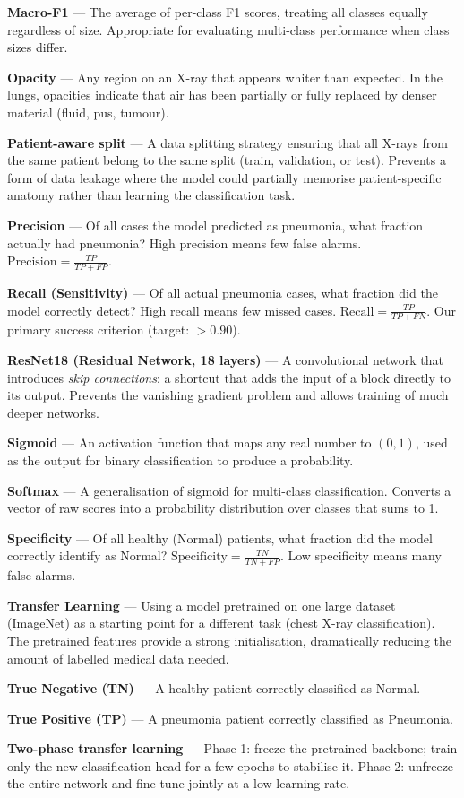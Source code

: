 \documentclass[12pt,a4paper]{article}
\begin{document}
\begin{tcolorbox}[glossbox={Key Terms Explained}]
\medskip
\textbf{Macro-F1} --- The average of per-class F1 scores, treating all classes equally regardless of size. Appropriate for evaluating multi-class performance when class sizes differ.

\medskip
\textbf{Opacity} --- Any region on an X-ray that appears whiter than expected. In the lungs, opacities indicate that air has been partially or fully replaced by denser material (fluid, pus, tumour).

\medskip
\textbf{Patient-aware split} --- A data splitting strategy ensuring that all X-rays from the same patient belong to the same split (train, validation, or test). Prevents a form of data leakage where the model could partially memorise patient-specific anatomy rather than learning the classification task.

\medskip
\textbf{Precision} --- Of all cases the model predicted as pneumonia, what fraction actually had pneumonia? High precision means few false alarms. $\text{Precision} = \frac{TP}{TP + FP}$.

\medskip
\textbf{Recall (Sensitivity)} --- Of all actual pneumonia cases, what fraction did the model correctly detect? High recall means few missed cases. $\text{Recall} = \frac{TP}{TP + FN}$. Our primary success criterion (target: $> 0.90$).

\medskip
\textbf{ResNet18 (Residual Network, 18 layers)} --- A convolutional network that introduces \emph{skip connections}: a shortcut that adds the input of a block directly to its output. Prevents the vanishing gradient problem and allows training of much deeper networks.

\medskip
\textbf{Sigmoid} --- An activation function that maps any real number to $(0, 1)$, used as the output for binary classification to produce a probability.

\medskip
\textbf{Softmax} --- A generalisation of sigmoid for multi-class classification. Converts a vector of raw scores into a probability distribution over classes that sums to 1.

\medskip
\textbf{Specificity} --- Of all healthy (Normal) patients, what fraction did the model correctly identify as Normal? $\text{Specificity} = \frac{TN}{TN + FP}$. Low specificity means many false alarms.

\medskip
\textbf{Transfer Learning} --- Using a model pretrained on one large dataset (ImageNet) as a starting point for a different task (chest X-ray classification). The pretrained features provide a strong initialisation, dramatically reducing the amount of labelled medical data needed.

\medskip
\textbf{True Negative (TN)} --- A healthy patient correctly classified as Normal.

\medskip
\textbf{True Positive (TP)} --- A pneumonia patient correctly classified as Pneumonia.

\medskip
\textbf{Two-phase transfer learning} --- Phase 1: freeze the pretrained backbone; train only the new classification head for a few epochs to stabilise it. Phase 2: unfreeze the entire network and fine-tune jointly at a low learning rate.

\end{tcolorbox}
\end{document}
